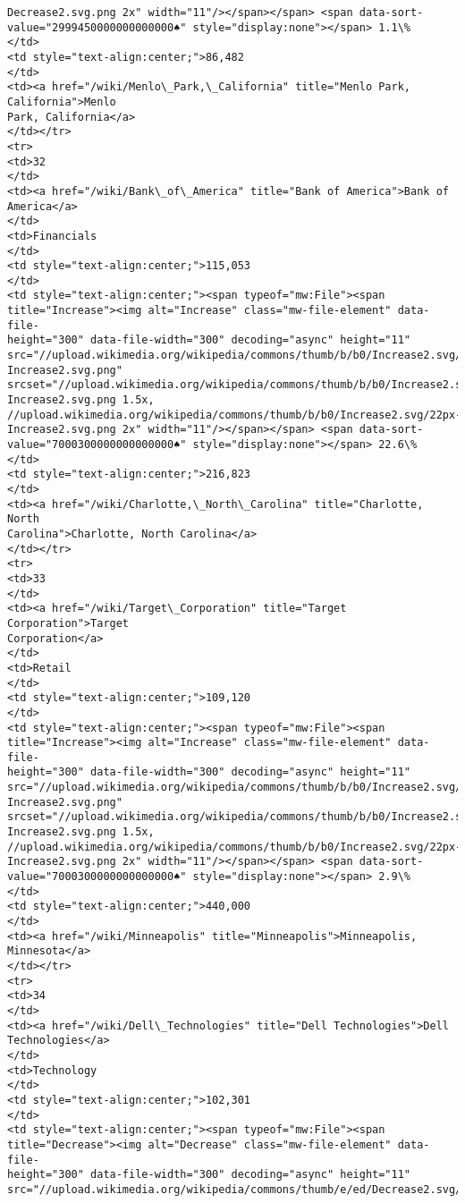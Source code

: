 \documentclass[11pt]{article}
\begin{document}
\begin{Verbatim}[commandchars=\\\{\}]
Decrease2.svg.png 2x" width="11"/></span></span> <span data-sort-
value="2999450000000000000♠" style="display:none"></span> 1.1\%
</td>
<td style="text-align:center;">86,482
</td>
<td><a href="/wiki/Menlo\_Park,\_California" title="Menlo Park, California">Menlo
Park, California</a>
</td></tr>
<tr>
<td>32
</td>
<td><a href="/wiki/Bank\_of\_America" title="Bank of America">Bank of America</a>
</td>
<td>Financials
</td>
<td style="text-align:center;">115,053
</td>
<td style="text-align:center;"><span typeof="mw:File"><span
title="Increase"><img alt="Increase" class="mw-file-element" data-file-
height="300" data-file-width="300" decoding="async" height="11"
src="//upload.wikimedia.org/wikipedia/commons/thumb/b/b0/Increase2.svg/11px-
Increase2.svg.png"
srcset="//upload.wikimedia.org/wikipedia/commons/thumb/b/b0/Increase2.svg/17px-
Increase2.svg.png 1.5x,
//upload.wikimedia.org/wikipedia/commons/thumb/b/b0/Increase2.svg/22px-
Increase2.svg.png 2x" width="11"/></span></span> <span data-sort-
value="7000300000000000000♠" style="display:none"></span> 22.6\%
</td>
<td style="text-align:center;">216,823
</td>
<td><a href="/wiki/Charlotte,\_North\_Carolina" title="Charlotte, North
Carolina">Charlotte, North Carolina</a>
</td></tr>
<tr>
<td>33
</td>
<td><a href="/wiki/Target\_Corporation" title="Target Corporation">Target
Corporation</a>
</td>
<td>Retail
</td>
<td style="text-align:center;">109,120
</td>
<td style="text-align:center;"><span typeof="mw:File"><span
title="Increase"><img alt="Increase" class="mw-file-element" data-file-
height="300" data-file-width="300" decoding="async" height="11"
src="//upload.wikimedia.org/wikipedia/commons/thumb/b/b0/Increase2.svg/11px-
Increase2.svg.png"
srcset="//upload.wikimedia.org/wikipedia/commons/thumb/b/b0/Increase2.svg/17px-
Increase2.svg.png 1.5x,
//upload.wikimedia.org/wikipedia/commons/thumb/b/b0/Increase2.svg/22px-
Increase2.svg.png 2x" width="11"/></span></span> <span data-sort-
value="7000300000000000000♠" style="display:none"></span> 2.9\%
</td>
<td style="text-align:center;">440,000
</td>
<td><a href="/wiki/Minneapolis" title="Minneapolis">Minneapolis, Minnesota</a>
</td></tr>
<tr>
<td>34
</td>
<td><a href="/wiki/Dell\_Technologies" title="Dell Technologies">Dell
Technologies</a>
</td>
<td>Technology
</td>
<td style="text-align:center;">102,301
</td>
<td style="text-align:center;"><span typeof="mw:File"><span
title="Decrease"><img alt="Decrease" class="mw-file-element" data-file-
height="300" data-file-width="300" decoding="async" height="11"
src="//upload.wikimedia.org/wikipedia/commons/thumb/e/ed/Decrease2.svg/11px-

\end{Verbatim}
\end{document}
